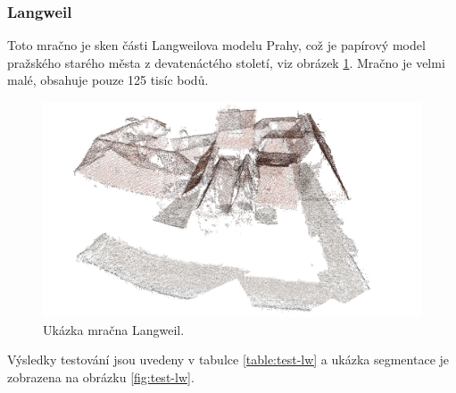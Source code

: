 \documentclass[11pt,twoside,a4paper]{book}
\begin{document}
\cleardoublepage
\subsubsection{Langweil}

Toto mračno je sken části Langweilova modelu Prahy, což je papírový model pražského starého města z devatenáctého století, viz obrázek \ref{fig:langweil}. Mračno je velmi malé, obsahuje pouze 125 tisíc bodů.

\begin{figure}[H]
\begin{center}
\includegraphics[width=\textwidth]{figures/langweil}
\caption{Ukázka mračna Langweil.}
\label{fig:langweil}
\end{center}
\end{figure}

Výsledky testování jsou uvedeny v tabulce \ref{table:test-lw} a ukázka segmentace je zobrazena na obrázku \ref{fig:test-lw}.
\end{document}
